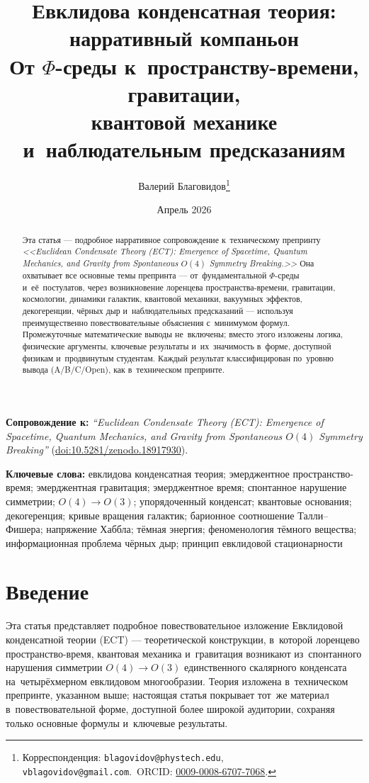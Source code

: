 \documentclass[11pt,a4paper]{article}
\title{\textbf{Евклидова конденсатная теория: нарративный компаньон}\\[6pt]
\large От $\Phi$-среды к~пространству-времени, гравитации,\\
квантовой механике и~наблюдательным предсказаниям}
\author{Валерий Благовидов\thanks{Корреспонденция: \texttt{blagovidov@phystech.edu}, \texttt{vblagovidov@gmail.com}.~ORCID: \href{https://orcid.org/0009-0008-6707-7068}{0009-0008-6707-7068}.}}
\date{Апрель 2026}
\begin{document}
\maketitle

\begin{abstract}
Эта статья --- подробное нарративное сопровождение к~техническому препринту \emph{<<Euclidean Condensate Theory (ECT): Emergence of Spacetime, Quantum Mechanics, and Gravity from Spontaneous $O(4)$ Symmetry Breaking.>>} Она охватывает все основные темы препринта --- от~фундаментальной $\Phi$-среды и~её~постулатов, через возникновение лоренцева пространства-времени, гравитации, космологии, динамики галактик, квантовой механики, вакуумных эффектов, декогеренции, чёрных дыр и~наблюдательных предсказаний --- используя преимущественно повествовательные объяснения с~минимумом формул. Промежуточные математические выводы не~включены; вместо этого изложены логика, физические аргументы, ключевые результаты и~их~значимость в~форме, доступной физикам и~продвинутым студентам. Каждый результат классифицирован по~уровню вывода (A/B/C/Open), как в~техническом препринте.
\end{abstract}

\noindent\textbf{Сопровождение к:}
\emph{``Euclidean Condensate Theory (ECT): Emergence of Spacetime,
Quantum Mechanics, and Gravity from Spontaneous $O(4)$ Symmetry
Breaking''}
(\href{https://doi.org/10.5281/zenodo.18917930}{doi:10.5281/zenodo.18917930}).

\medskip
\noindent\textbf{Ключевые слова:}
евклидова конденсатная теория; эмерджентное пространство-время; эмерджентная гравитация;
эмерджентное время; спонтанное нарушение симметрии; $O(4)\to O(3)$;
упорядоченный конденсат; квантовые основания; декогеренция;
кривые вращения галактик; барионное соотношение Талли--Фишера;
напряжение Хаббла; тёмная энергия; феноменология тёмного вещества;
информационная проблема чёрных дыр; принцип евклидовой стационарности

\newpage
\setcounter{tocdepth}{2}
\tableofcontents
\newpage

\section*{Введение}

Эта статья представляет подробное повествовательное изложение Евклидовой конденсатной теории (ECT) --- теоретической конструкции, в~которой лоренцево пространство-время, квантовая механика и~гравитация возникают из~спонтанного нарушения симметрии $O(4)\to O(3)$ единственного скалярного конденсата на~четырёхмерном евклидовом многообразии. Теория изложена в~техническом препринте, указанном выше; настоящая статья покрывает тот~же материал в~повествовательной форме, доступной более широкой аудитории, сохраняя только основные формулы и~ключевые результаты.
\end{document}
